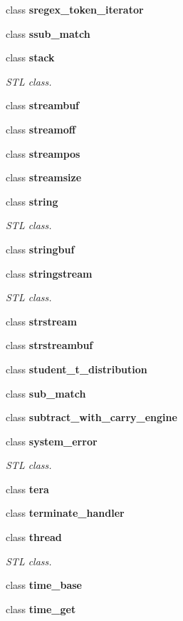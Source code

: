 \begin{DoxyCompactItemize}
class \textbf{ sregex\+\_\+token\+\_\+iterator}
\item 
class \textbf{ ssub\+\_\+match}
\item 
class \textbf{ stack}
\begin{DoxyCompactList}\small\item\em S\+TL class. \end{DoxyCompactList}\item 
class \textbf{ streambuf}
\item 
class \textbf{ streamoff}
\item 
class \textbf{ streampos}
\item 
class \textbf{ streamsize}
\item 
class \textbf{ string}
\begin{DoxyCompactList}\small\item\em S\+TL class. \end{DoxyCompactList}\item 
class \textbf{ stringbuf}
\item 
class \textbf{ stringstream}
\begin{DoxyCompactList}\small\item\em S\+TL class. \end{DoxyCompactList}\item 
class \textbf{ strstream}
\item 
class \textbf{ strstreambuf}
\item 
class \textbf{ student\+\_\+t\+\_\+distribution}
\item 
class \textbf{ sub\+\_\+match}
\item 
class \textbf{ subtract\+\_\+with\+\_\+carry\+\_\+engine}
\item 
class \textbf{ system\+\_\+error}
\begin{DoxyCompactList}\small\item\em S\+TL class. \end{DoxyCompactList}\item 
class \textbf{ tera}
\item 
class \textbf{ terminate\+\_\+handler}
\item 
class \textbf{ thread}
\begin{DoxyCompactList}\small\item\em S\+TL class. \end{DoxyCompactList}\item 
class \textbf{ time\+\_\+base}
\item 
class \textbf{ time\+\_\+get}
\item 

\end{DoxyCompactItemize}
